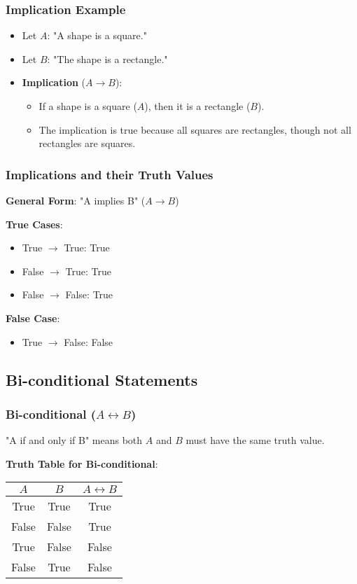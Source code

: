 \documentclass{article}
\begin{document}
\subsubsection{Implication Example}
\begin{itemize}
    \item Let $A$: "A shape is a square."
    \item Let $B$: "The shape is a rectangle."
    \item \textbf{Implication} ($A \rightarrow B$):
    \begin{itemize}
        \item If a shape is a square ($A$), then it is a rectangle ($B$).
        \item The implication is true because all squares are rectangles, though not all rectangles are squares.
    \end{itemize}
\end{itemize}

\subsubsection{Implications and their Truth Values}

\textbf{General Form}: "A implies B" ($A \rightarrow B$)

\textbf{True Cases}:
\begin{itemize}
    \item True $\rightarrow$ True: True
    \item False $\rightarrow$ True: True
    \item False $\rightarrow$ False: True
\end{itemize}

\textbf{False Case}:
\begin{itemize}
    \item True $\rightarrow$ False: False
\end{itemize}

\subsection{Bi-conditional Statements}

\subsubsection{Bi-conditional ($A \leftrightarrow B$)}
"A if and only if B" means both $A$ and $B$ must have the same truth value.

\textbf{Truth Table for Bi-conditional}:
\begin{center}
    \begin{tabular}{|c|c|c|}
        \hline
        $A$ & $B$ & $A \leftrightarrow B$ \\
        \hline
        True & True & True \\
        False & False & True \\
        True & False & False \\
        False & True & False \\
        \hline
    \end{tabular}
\end{center}
\end{document}
